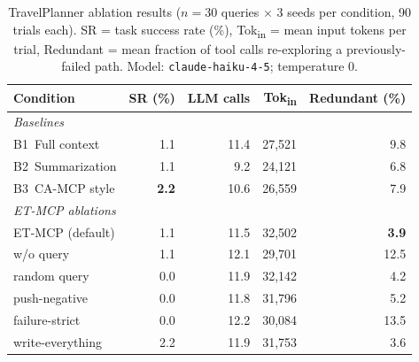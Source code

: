 \begin{table}[t]
\centering
\caption{TravelPlanner ablation results ($n=30$ queries $\times$ 3 seeds per condition, 90 trials each).
  SR = task success rate (\%), Tok\textsubscript{in} = mean input tokens per trial,
  Redundant = mean fraction of tool calls re-exploring a previously-failed path.
  Model: \texttt{claude-haiku-4-5}; temperature 0.}
\label{tab:tp-ablation}
\begin{tabular}{lrrrr}
\toprule
\textbf{Condition} & \textbf{SR (\%)} & \textbf{LLM calls} & \textbf{Tok\textsubscript{in}} & \textbf{Redundant (\%)} \\
\midrule
\multicolumn{5}{l}{\textit{Baselines}} \\
B1~Full context    & 1.1 & 11.4 & 27{,}521 & 9.8 \\
B2~Summarization   & 1.1 &  9.2 & 24{,}121 & 6.8 \\
B3~CA-MCP style    & \textbf{2.2} & 10.6 & 26{,}559 & 7.9 \\
\midrule
\multicolumn{5}{l}{\textit{ET-MCP ablations}} \\
ET-MCP (default)          & 1.1 & 11.5 & 32{,}502 & \textbf{3.9} \\
\quad w/o query            & 1.1 & 12.1 & 29{,}701 & 12.5 \\
\quad random query         & 0.0 & 11.9 & 32{,}142 &  4.2 \\
\quad push-negative        & 0.0 & 11.8 & 31{,}796 &  5.2 \\
\quad failure-strict       & 0.0 & 12.2 & 30{,}084 & 13.5 \\
\quad write-everything     & 2.2 & 11.9 & 31{,}753 &  3.6 \\
\bottomrule
\end{tabular}
\end{table}
